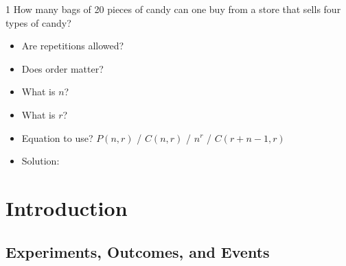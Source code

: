 \documentclass[a4paper,12pt]{book}
\newcounter{question}
\begin{document}
        \begin{question}{\thequestion}{1}
            How many bags of 20 pieces of candy can one buy
            from a store that sells four types of candy?           
            
            \begin{itemize}
                \item[]     Are repetitions allowed?    
                \item[]     Does order matter?          
                \item[]     What is $n$?                
                \item[]     What is $r$?                
                \item[]     Equation to use? $P(n,r)$ / $C(n,r)$ / $n^{r}$ / $C(r+n-1,r)$            
                \item[]     Solution: 
            \end{itemize}
        \end{question}



    \newpage
    
    \section{Introduction}
    \subsection{Experiments, Outcomes, and Events}
\end{document}
